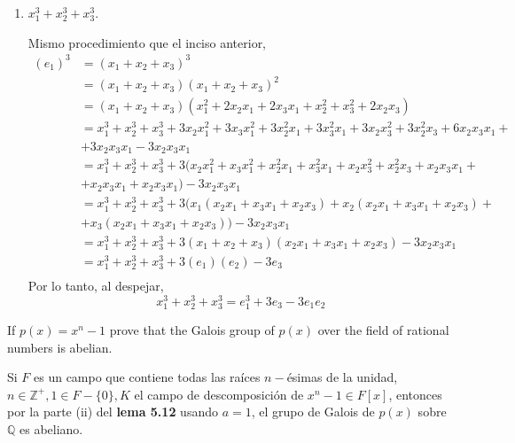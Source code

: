 \begin{problema}[Problema 8]
\begin{enumerate}
\begin{sol}
        \end{sol}
        \item $x_1^3+x_2^3+x_3^3$.
        \begin{sol}
            Mismo procedimiento que el inciso anterior, 
            \begin{align*}
                (e_1)^3&= (x_1+x_2+x_3)^3\\
                &= (x_1+x_2+x_3)(x_1+x_2+x_3)^2\\
                &= (x_1+x_2+x_3)(x_1^2+2x_2x_1+2x_3x_1+x_2^2+x_3^2+2x_2x_3)\\
                &= x_1^3+ x_2^3+x_3^3 +3 x_2 x_1^2+3 x_3 x_1^2+3 x_2^2 x_1+3 x_3^2 x_1+3 x_2 x_3^2+3 x_2^2 x_3+6 x_2 x_3 x_1+\\
                &+3x_2 x_3 x_1-3x_2 x_3 x_1\\
                &=x_1^3+ x_2^3+x_3^3 + 3(x_2 x_1^2+x_3 x_1^2+x_2^2 x_1+x_3^2 x_1+ x_2 x_3^2+ x_2^2 x_3+ x_2 x_3 x_1+\\
                &+ x_2 x_3 x_1+x_2 x_3 x_1) - 3x_2 x_3 x_1\\
                &= x_1^3+ x_2^3+x_3^3 + 3(x_1(x_2x_1+x_3x_1+x_2x_3)+x_2(x_2x_1+x_3x_1+x_2x_3)+\\
                &+x_3(x_2x_1+x_3x_1+x_2x_3)) -3x_2 x_3 x_1\\
                &= x_1^3+ x_2^3+x_3^3 +3(x_1+x_2+x_3)(x_2x_1+x_3x_1+x_2x_3)-3x_2 x_3 x_1\\
                &= x_1^3+ x_2^3+x_3^3 +3(e_1)(e_2)-3e_3\\
            \end{align*}
            Por lo tanto, al despejar, 
            $$x_1^3+ x_2^3+x_3^3 = e_1^3+3e_3-3e_1e_2$$
        \end{sol}
    \end{enumerate}

\end{problema}

\begin{problema}[Problema 12]
    If $p(x)=x^n-1$ prove that the Galois group of $p(x)$ over the field of rational numbers is abelian.
    \begin{sol}
        Si $F$ es un campo que contiene todas las raíces $n-$ésimas de la unidad, $n\in\mathbb{Z}^+,1\in F-\{0\}, K$ el campo de descomposición de $x^n-1\in F[x]$, entonces por la parte (ii) del \textbf{lema 5.12} usando $a=1$, el grupo de Galois de $p(x)$ sobre $\mathbb{Q}$ es abeliano. 
    \end{sol}
\end{problema}

%
%

